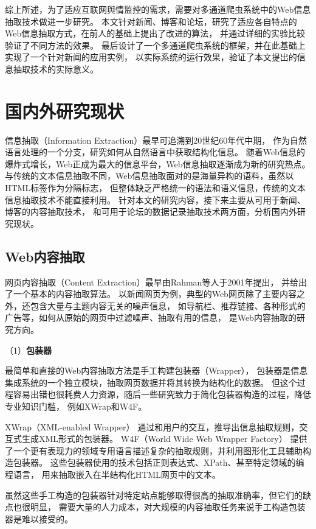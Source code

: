 综上所述，为了适应互联网舆情监控的需求，需要对多通道爬虫系统中的Web信息抽取技术做进一步研究。
本文针对新闻、博客和论坛，研究了适应各自特点的Web信息抽取方式，在前人的基础上提出了改进的算法，
并通过详细的实验比较验证了不同方法的效果。
最后设计了一个多通道爬虫系统的框架，并在此基础上实现了一个针对新闻的应用实例，
以实际系统的运行效果，验证了本文提出的信息抽取技术的实际意义。

\section{国内外研究现状}
信息抽取（Information Extraction）最早可追溯到20世纪60年代中期，
作为自然语言处理的一个分支，研究如何从自然语言中获取结构化信息。
随着Web信息的爆炸式增长，Web正成为最大的信息平台，Web信息抽取逐渐成为新的研究热点。
与传统的文本信息抽取不同，Web信息抽取面对的是海量异构的语料，虽然以HTML标签作为分隔标志，
但整体缺乏严格统一的语法和语义信息，传统的文本信息抽取技术不能直接利用。
针对本文的研究内容，接下来主要从可用于新闻、博客的内容抽取技术，
和可用于论坛的数据记录抽取技术两方面，分析国内外研究现状。

\subsection{Web内容抽取}
网页内容抽取（Content Extraction）最早由Rahman等人于2001年提出，
并给出了一个基本的内容抽取算法。
以新闻网页为例，典型的Web网页除了主要内容之外，还包含大量与主题内容无关的噪声信息，
如导航栏、推荐链接、各种形式的广告等，如何从原始的网页中过滤噪声、抽取有用的信息，
是Web内容抽取的研究方向。

（1）\textbf{包装器}

最简单和直接的Web内容抽取方法是手工构建包装器（Wrapper），
包装器是信息集成系统的一个独立模块，抽取网页数据并将其转换为结构化的数据。
但这个过程容易出错也很耗费人力资源，随后一些研究致力于简化包装器构造的过程，降低专业知识门槛，
例如XWrap和W4F。

XWrap（XML-enabled Wrapper）
通过和用户的交互，推导出信息抽取规则，交互式生成XML形式的包装器。
W4F（World Wide Web Wrapper Factory）
提供了一个更有表现力的领域专用语言描述复杂的抽取规则，并利用图形化工具辅助构造包装器。
这些包装器使用的技术包括正则表达式、XPath、甚至特定领域的编程语言，
用来抽取嵌入在半结构化HTML网页中的文本。

虽然这些手工构造的包装器针对特定站点能够取得很高的抽取准确率，但它们的缺点也很明显，
需要大量的人力成本，对大规模的内容抽取任务来说手工构造包装器是难以接受的。

